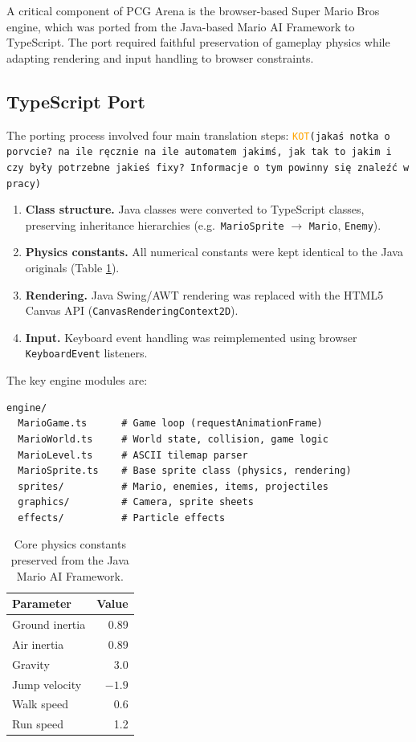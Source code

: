 \documentclass[shortabstract, mgr, english]{iithesis}
\newcommand{\DEBUG}[1]{{#1}} %
\newcommand{\KOT}[1]{\DEBUG{\tt{\textcolor{orange}{KOT}(}{#1}{)}}}
\begin{document}
A critical component of PCG Arena is the browser-based Super Mario Bros engine, which was
ported from the Java-based Mario AI Framework \cite{karakovskiy2012marioai} to TypeScript.
The port required faithful preservation of gameplay physics while adapting rendering and
input handling to browser constraints.

\subsection{TypeScript Port}
\label{subsec:sd-ts-port}

The porting process involved four main translation steps: \KOT{jakaś notka o porvcie? na ile ręcznie na ile automatem jakimś, jak tak to jakim i czy były potrzebne jakieś fixy? Informacje o tym powinny się znaleźć w pracy}

\begin{enumerate}
    \item \textbf{Class structure.} Java classes were converted to TypeScript classes,
          preserving inheritance hierarchies (e.g.\ \texttt{MarioSprite} $\to$
          \texttt{Mario}, \texttt{Enemy}).
    \item \textbf{Physics constants.} All numerical constants were kept identical to the
          Java originals (Table \ref{tab:physics}).
    \item \textbf{Rendering.} Java Swing/AWT rendering was replaced with the HTML5
          Canvas API (\texttt{CanvasRenderingContext2D}).
    \item \textbf{Input.} Keyboard event handling was reimplemented using browser
          \texttt{KeyboardEvent} listeners.
\end{enumerate}

The key engine modules are:

\begin{lstlisting}
engine/
  MarioGame.ts      # Game loop (requestAnimationFrame)
  MarioWorld.ts     # World state, collision, game logic
  MarioLevel.ts     # ASCII tilemap parser
  MarioSprite.ts    # Base sprite class (physics, rendering)
  sprites/          # Mario, enemies, items, projectiles
  graphics/         # Camera, sprite sheets
  effects/          # Particle effects
\end{lstlisting}

\begin{table}[H]
\centering
\begin{tabular}{lr}
\toprule
\textbf{Parameter} & \textbf{Value} \\
\midrule
Ground inertia & 0.89 \\
Air inertia    & 0.89 \\
Gravity        & 3.0 \\
Jump velocity  & $-1.9$ \\
Walk speed     & 0.6 \\
Run speed      & 1.2 \\
\bottomrule
\end{tabular}
\caption{Core physics constants preserved from the Java Mario AI Framework.}
\label{tab:physics}
\end{table}
\end{document}
